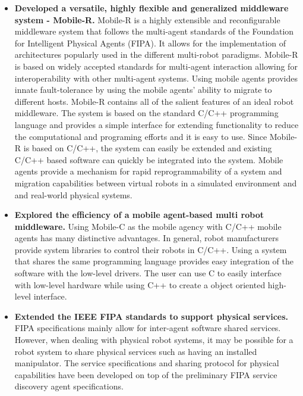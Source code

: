     \begin{itemize}
      \item \textbf{Developed a versatile, highly flexible and generalized
        middleware system - Mobile-R.} 
        Mobile-R is a highly extensible and reconfigurable middleware system
          that follows the multi-agent standards of the Foundation for 
          Intelligent Physical Agents (FIPA).
        It allows for the implementation of architectures popularly used in the 
          different multi-robot paradigms.
        Mobile-R is based on widely accepted standards for multi-agent 
          interaction allowing for interoperability with other multi-agent systems.
        Using mobile agents provides innate fault-tolerance by using the mobile
          agents' ability to migrate to different hosts.
        Mobile-R contains all of the salient features of an ideal robot 
          middleware.
        The system is based on the standard C/C++ programming language and 
          provides a simple interface for extending functionality to reduce 
          the computational and programing efforts and it is easy to use.
        Since Mobile-R is based on C/C++, the system can easily be 
          extended and existing C/C++ based software can quickly be integrated
          into the system.
        Mobile agents provide a mechanism for rapid reprogrammability of a
          system and migration capabilities between virtual robots in a 
          simulated environment and and real-world physical systems.
        
      \item \textbf{Explored the efficiency of a mobile agent-based multi robot 
                    middleware.}
         Using Mobile-C as the mobile agency with C/C++ mobile agents has many 
           distinctive advantages.
         In general, robot manufacturers provide system libraries to control
           their robots in C/C++.
         Using a system that shares the same programming language provides easy
           integration of the software with the low-level drivers.
         The user can use C to easily interface with low-level hardware while using
           C++ to create a object oriented high-level interface.

      \item \textbf{Extended the IEEE FIPA standards to support physical services.}
        FIPA specifications mainly allow for inter-agent software shared 
          services.
        However, when dealing with physical robot systems, it may be possible
          for a robot system to share physical services such as having an
          installed manipulator.
        The service specifications and sharing protocol for physical 
          capabilities have been developed on top of the preliminary FIPA 
          service discovery agent specifications.


\end{itemize}
